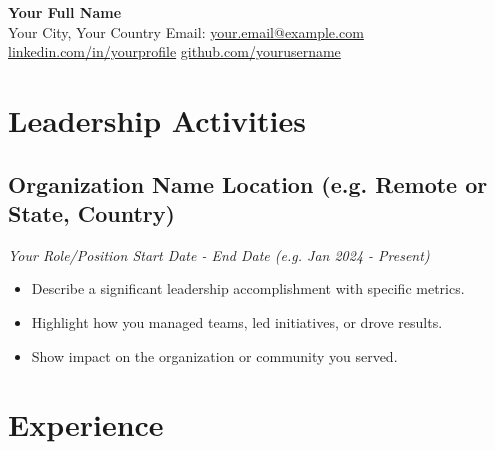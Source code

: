 \documentclass[a4paper,10pt]{article}
\begin{document}
\begin{center}
    {\LARGE \textbf{Your Full Name}} 
    \\ [0.1cm]
    Your City, Your Country 
    {\textbullet}
    Email: \href{mailto:your.email@example.com}{your.email@example.com} 
    {\textbullet}
    \href{https://linkedin.com/in/yourprofile}{linkedin.com/in/yourprofile} 
    {\textbullet}
    \href{https://github.com/yourusername}{github.com/yourusername}
\end{center}


\section{Leadership Activities} 
    \subsection*{\texorpdfstring{
            \textbf{Organization Name} \hfill Location (e.g. Remote or State, Country)
        }{
            Organization Name (Leadership) -- Location
        }}
    \textit{Your Role/Position \hfill Start Date - End Date (e.g. Jan 2024 - Present)}
        \begin{itemize}
            \item Describe a significant leadership accomplishment with specific metrics.
            \item Highlight how you managed teams, led initiatives, or drove results.
            \item Show impact on the organization or community you served.
        \end{itemize}


\section{Experience}
\end{document}
